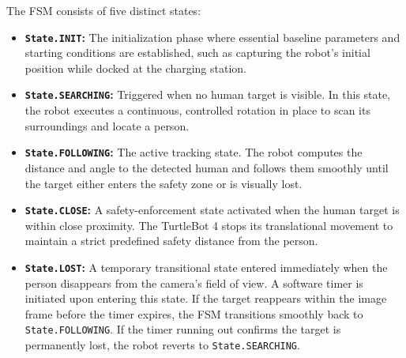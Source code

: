 \newpage

The FSM consists of five distinct states:

\begin{itemize}
	\item \textbf{\texttt{State.INIT}:} The initialization phase where essential baseline parameters and starting conditions are established, such as capturing the robot's initial position while docked at the charging station.
	\item \textbf{\texttt{State.SEARCHING}:} Triggered when no human target is visible. In this state, the robot executes a continuous, controlled rotation in place to scan its surroundings and locate a person.
	\item \textbf{\texttt{State.FOLLOWING}:} The active tracking state. The robot computes the distance and angle to the detected human and follows them smoothly until the target either enters the safety zone or is visually lost.
	\item \textbf{\texttt{State.CLOSE}:} A safety-enforcement state activated when the human target is within close proximity. The TurtleBot 4 stops its translational movement to maintain a strict predefined safety distance from the person.
	\item \textbf{\texttt{State.LOST}:} A temporary transitional state entered immediately when the person disappears from the camera's field of view. A software timer is initiated upon entering this state. If the target reappears within the image frame before the timer expires, the FSM transitions smoothly back to \texttt{State.FOLLOWING}. If the timer running out confirms the target is permanently lost, the robot reverts to \texttt{State.SEARCHING}.
\end{itemize}
